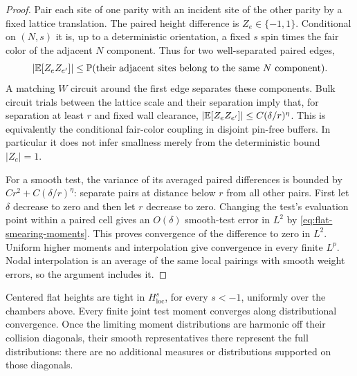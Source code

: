 \begin{proof}
Pair each site of one parity with an incident site of the other parity by a
fixed lattice translation. The paired height difference is $Z_e\in\{-1,1\}$.
Conditional on $(N,s)$ it is, up to a deterministic orientation, a fixed
$s$ spin times the fair color of the adjacent $N$ component. Thus for two
well-separated paired edges,
\[
 |\mathbb E[Z_eZ_{e'}]|\le
 \mathbb P(\text{their adjacent sites belong to the same }N\text{ component}).
\]
A matching $W$ circuit around the first edge separates these components.
Bulk circuit trials between the lattice scale and their separation imply
that, for separation at least $r$ and fixed wall clearance,
$|\mathbb E[Z_eZ_{e'}]|\le C(\delta/r)^\eta$. This is equivalently the conditional
fair-color coupling in disjoint pin-free buffers. In particular it does not
infer smallness merely from the deterministic bound $|Z_e|=1$.

For a smooth test, the variance of its averaged paired differences is bounded
by $C r^2+C(\delta/r)^\eta$: separate pairs at distance below $r$ from all
other pairs. First let $\delta$ decrease to zero and then let $r$ decrease
to zero. Changing the test's evaluation point within a paired cell gives an
$O(\delta)$ smooth-test error in $L^2$ by
\cref{eq:flat-smearing-moments}. This proves convergence of the difference
to zero in $L^2$. Uniform higher moments and interpolation give convergence
in every finite $L^p$. Nodal interpolation is an average of the same local
pairings with smooth weight errors, so the argument includes it.
\end{proof}

\begin{lemma}
\label{lem:flat-tightness}
Centered flat heights are tight in $H^s_{\mathrm{loc}}$, for every $s<-1$,
uniformly over the chambers above. Every finite joint test moment converges
along distributional convergence. Once the limiting moment distributions
are harmonic off their collision diagonals, their smooth representatives
there represent the full distributions: there are no additional measures
or distributions supported on those diagonals.
\end{lemma}

